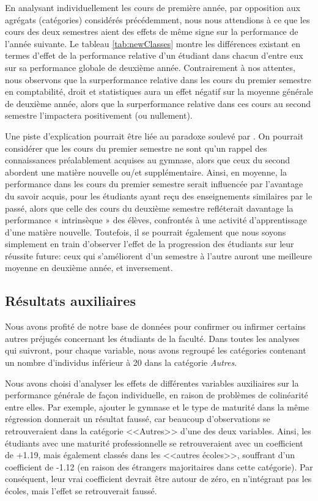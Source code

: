 En analysant individuellement les cours de première année, par opposition aux agrégats (catégories) considérés précédemment, nous nous attendions à ce que les cours des deux semestres aient des effets de même signe sur la performance de l'année suivante. Le tableau \ref{tab:newClasses} montre les différences existant en termes d’effet de la performance relative d’un étudiant dans chacun d’entre eux sur sa performance globale de deuxième année. Contrairement à nos attentes, nous observons que la surperformance relative dans les cours du premier semestre en comptabilité, droit et statistiques aura un effet négatif sur la moyenne générale de deuxième année, alors que la surperformance relative dans ces cours au second semestre l’impactera positivement (ou nullement).

Une piste d'explication pourrait être liée au paradoxe soulevé par \cite{roschelle}. On pourrait considérer que les cours du premier semestre ne sont qu’un rappel des connaissances préalablement acquises au gymnase, alors que ceux du second abordent une matière nouvelle ou/et supplémentaire. Ainsi, en moyenne, la performance dans les cours du premier semestre serait influencée par l’avantage du savoir acquis, pour les étudiants ayant reçu des enseignements similaires par le passé, alors que celle des cours du deuxième semestre refléterait davantage la performance « intrinsèque » des élèves, confrontés à une activité d’apprentissage d’une matière nouvelle. Toutefois, il se pourrait également que nous soyons simplement en train d'observer l'effet de la progression des étudiants sur leur réussite future: ceux qui s'améliorent d'un semestre à l'autre auront une meilleure moyenne en deuxième année, et inversement.


\subsection{Résultats auxiliaires}

Nous avons profité de notre base de données pour confirmer ou infirmer certains autres préjugés concernant les étudiants de la faculté. Dans toutes les analyses qui suivront, pour chaque variable, nous avons regroupé les catégories contenant un nombre d'individus inférieur à 20 dans la catégorie \textit{Autres}.

Nous avons choisi d'analyser les effets de différentes variables auxiliaires sur la performance générale de façon individuelle, en raison de problèmes de colinéarité entre elles. Par exemple, ajouter le gymnase et le type de maturité dans la même régression donnerait un résultat faussé, car beaucoup d'observations se retrouveraient dans la catégorie <<Autres>> d'une des deux variables. Ainsi, les étudiants avec une maturité professionnelle se retrouveraient avec un coefficient de +1.19, mais également classés dans les <<autres écoles>>, souffrant d'un coefficient de -1.12 (en raison des étrangers majoritaires dans cette catégorie). Par conséquent, leur vrai coefficient devrait être autour de zéro, en n'intégrant pas les écoles, mais l'effet se retrouverait faussé.


